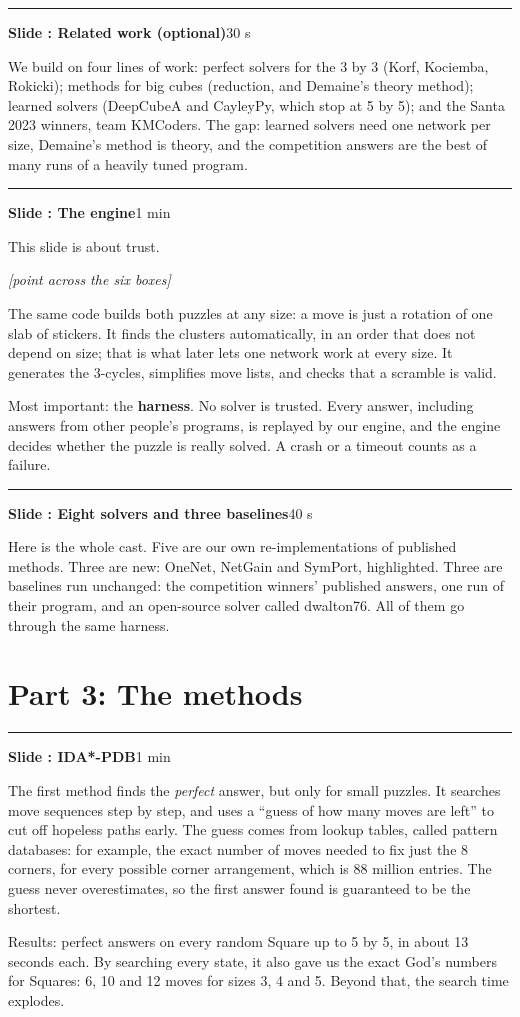 \documentclass[11pt,a4paper]{article}
\newcounter{slide}
\newcommand{\slide}[2]{\par\bigskip\stepcounter{slide}%
  {\color{NavyBlue}\rule{\linewidth}{0.4pt}}\par
  \textbf{\large Slide \arabic{slide}: #1}\hfill{\small\color{gray}#2}\par}
\newcommand{\act}[1]{\par{\small\color{OliveGreen}\textit{[#1]}}\par}
\begin{document}
\slide{Related work (optional)}{30 s}
We build on four lines of work: perfect solvers for the 3 by 3 (Korf, Kociemba, Rokicki); methods for big cubes (reduction, and
Demaine's theory method); learned solvers (DeepCubeA and CayleyPy, which stop at 5 by 5); and the Santa 2023 winners, team
KMCoders. The gap: learned solvers need one network per size, Demaine's method is theory, and the competition answers are the
best of many runs of a heavily tuned program.

\slide{The engine}{1 min}
This slide is about trust. \act{point across the six boxes}
The same code builds both puzzles at any size: a move is just a rotation of one slab of stickers.
It finds the clusters automatically, in an order that does not depend on size; that is what later lets one network work at
every size.
It generates the 3-cycles, simplifies move lists, and checks that a scramble is valid.

Most important: the \textbf{harness}. No solver is trusted. Every answer, including answers from other people's programs,
is replayed by our engine, and the engine decides whether the puzzle is really solved. A crash or a timeout counts as a failure.

\slide{Eight solvers and three baselines}{40 s}
Here is the whole cast. Five are our own re-implementations of published methods. Three are new: OneNet, NetGain and SymPort,
highlighted. Three are baselines run unchanged: the competition winners' published answers, one run of their program, and an
open-source solver called dwalton76. All of them go through the same harness.

\section{Part 3: The methods}

\slide{IDA*-PDB}{1 min}
The first method finds the \emph{perfect} answer, but only for small puzzles.
It searches move sequences step by step, and uses a ``guess of how many moves are left'' to cut off hopeless paths early.
The guess comes from lookup tables, called pattern databases: for example, the exact number of moves needed to fix just the 8
corners, for every possible corner arrangement, which is 88 million entries. The guess never overestimates, so the first
answer found is guaranteed to be the shortest.

Results: perfect answers on every random Square up to 5 by 5, in about 13 seconds each. By searching every state, it also
gave us the exact God's numbers for Squares: 6, 10 and 12 moves for sizes 3, 4 and 5. Beyond that, the search time explodes.
\end{document}
